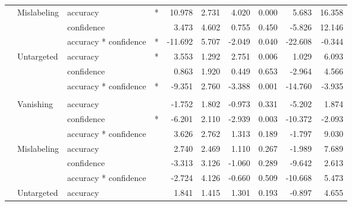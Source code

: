 \begin{longtable}[t]{llllrrrrrr}
\hspace{1em} & Mislabeling & accuracy & * & 10.978 & 2.731 & 4.020 & 0.000 & 5.683 & 16.358\\
\cmidrule{3-10}\nopagebreak
\hspace{1em} &  & confidence &  & 3.473 & 4.602 & 0.755 & 0.450 & -5.826 & 12.146\\
\cmidrule{3-10}\nopagebreak
\hspace{1em} &  & accuracy * confidence & * & -11.692 & 5.707 & -2.049 & 0.040 & -22.608 & -0.344\\
\cmidrule{2-10}\nopagebreak
\hspace{1em} & Untargeted & accuracy & * & 3.553 & 1.292 & 2.751 & 0.006 & 1.029 & 6.093\\
\cmidrule{3-10}\nopagebreak
\hspace{1em} &  & confidence &  & 0.863 & 1.920 & 0.449 & 0.653 & -2.964 & 4.566\\
\cmidrule{3-10}\nopagebreak
\hspace{1em} &  & accuracy * confidence & * & -9.351 & 2.760 & -3.388 & 0.001 & -14.760 & -3.935\\
\cmidrule{1-10}\pagebreak[0]
\addlinespace[0.3em]
\multicolumn{10}{l}{\textbf{Faster R-CNN}}\\
\hspace{1em} & Vanishing & accuracy &  & -1.752 & 1.802 & -0.973 & 0.331 & -5.202 & 1.874\\
\cmidrule{3-10}\nopagebreak
\hspace{1em} &  & confidence & * & -6.201 & 2.110 & -2.939 & 0.003 & -10.372 & -2.093\\
\cmidrule{3-10}\nopagebreak
\hspace{1em} &  & accuracy * confidence &  & 3.626 & 2.762 & 1.313 & 0.189 & -1.797 & 9.030\\
\cmidrule{2-10}\nopagebreak
\hspace{1em} & Mislabeling & accuracy &  & 2.740 & 2.469 & 1.110 & 0.267 & -1.989 & 7.689\\
\cmidrule{3-10}\nopagebreak
\hspace{1em} &  & confidence &  & -3.313 & 3.126 & -1.060 & 0.289 & -9.642 & 2.613\\
\cmidrule{3-10}\nopagebreak
\hspace{1em} &  & accuracy * confidence &  & -2.724 & 4.126 & -0.660 & 0.509 & -10.668 & 5.473\\
\cmidrule{2-10}\nopagebreak
\hspace{1em} & Untargeted & accuracy &  & 1.841 & 1.415 & 1.301 & 0.193 & -0.897 & 4.655\\

\end{longtable}
